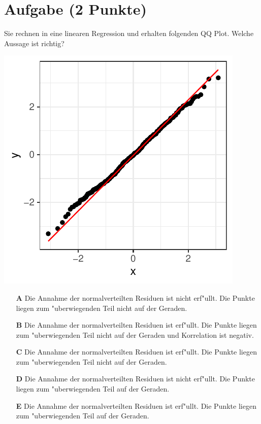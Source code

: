 \documentclass[a4paper, 10pt]{scrartcl}\usepackage[]{graphicx}\usepackage[]{xcolor}
\makeatletter
\def\maxwidth{ %
  \ifdim\Gin@nat@width>\linewidth
    \linewidth
  \else
    \Gin@nat@width
  \fi
}
\makeatother
\begin{document}
\section{Aufgabe \hfill (2 Punkte)}

Sie rechnen in eine linearen Regression und erhalten folgenden QQ
Plot. Welche Aussage ist richtig?




{\centering \includegraphics[width=\maxwidth]{img/mc-regression-05-a-1} 

}







\begin{enumerate}
\item [\textbf{A} \msquare] Die Annahme der normalverteilten Residuen ist nicht erf{"u}llt. Die Punkte liegen zum {"u}berwiegenden Teil nicht auf der Geraden.
\item [\textbf{B} \msquare] Die Annahme der normalverteilten Residuen ist erf{"u}llt. Die Punkte liegen zum {"u}berwiegenden Teil nicht auf der Geraden und Korrelation ist negativ.
\item [\textbf{C} \msquare] Die Annahme der normalverteilten Residuen ist erf{"u}llt. Die Punkte liegen zum {"u}berwiegenden Teil nicht auf der Geraden.
\item [\textbf{D} \msquare] Die Annahme der normalverteilten Residuen ist nicht erf{"u}llt. Die Punkte liegen zum {"u}berwiegenden Teil auf der Geraden.
\item [\textbf{E} \msquare] Die Annahme der normalverteilten Residuen ist erf{"u}llt. Die Punkte liegen zum {"u}berwiegenden Teil auf der Geraden.
\end{enumerate}
\end{document}
